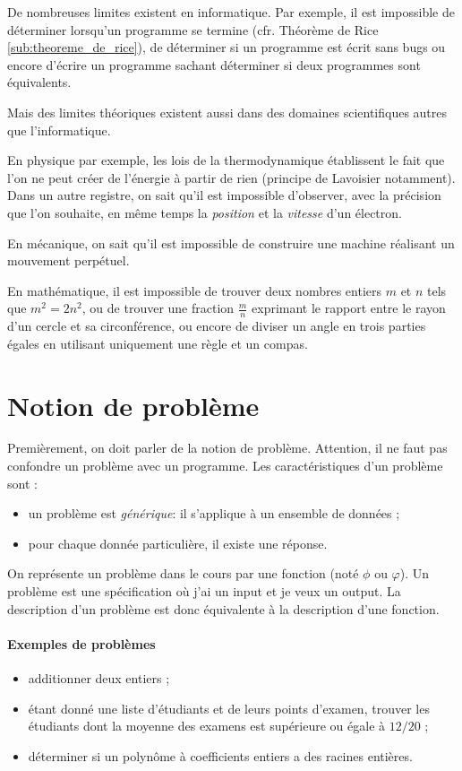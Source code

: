 De nombreuses limites existent en informatique. Par exemple, il est impossible de déterminer lorsqu'un programme se termine (cfr. Théorème de Rice \ref{sub:theoreme_de_rice}), de déterminer si un programme est écrit sans bugs ou encore d'écrire un programme sachant déterminer si deux programmes sont équivalents.

Mais des limites théoriques existent aussi dans des domaines scientifiques autres que l'informatique.

En physique par exemple, les lois de la thermodynamique établissent le fait que l'on ne peut créer de l'énergie à partir de rien (principe de Lavoisier notamment). Dans un autre registre, on sait qu'il est impossible d'observer, avec la précision que l'on souhaite, en même temps la \textit{position} et la \textit{vitesse} d'un électron.

En mécanique, on sait qu'il est impossible de construire une machine réalisant un mouvement perpétuel.

En mathématique, il est impossible de trouver deux nombres entiers $m$ et $n$ tels que $m^2 = 2n^2$, ou de trouver une fraction $\frac{m}{n}$ exprimant le rapport entre le rayon d'un cercle et sa circonférence, ou encore de diviser un angle en trois parties égales en utilisant uniquement une règle et un compas.

\section{Notion de problème}
\label{sec:notion_de_probleme}

Premièrement, on doit parler de la notion de problème.
Attention, il ne faut pas confondre un problème avec un programme.
Les caractéristiques d'un problème sont :

\begin{itemize}
	\item un problème est \emph{générique}: il s'applique à un ensemble de données ;
	\item pour chaque donnée particulière, il existe une réponse.
\end{itemize}

On représente un problème dans le cours par une fonction (noté $\phi$ ou $\varphi$).
Un problème est une spécification où j'ai un input et je veux un output.
La description d'un problème est donc équivalente à la description d'une fonction.

\paragraph{Exemples de problèmes}
\begin{itemize}
	\item additionner deux entiers ;
	\item étant donné une liste d'étudiants et de leurs points d'examen, trouver les étudiants dont la moyenne des examens est supérieure ou égale à $12/20$ ;
	\item déterminer si un polynôme à coefficients entiers a des racines entières.
\end{itemize}

